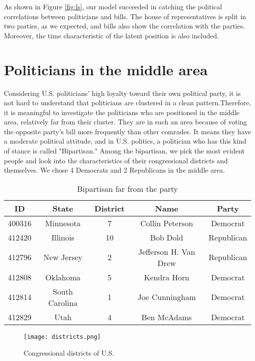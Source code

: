 \documentclass[a4paper, 11pt]{report}
\begin{document}
\begin{itemize}
\quad As shown in Figure \ref{fig:ls}, our model succeeded in catching the political correlations between politicians and bills. The house of representatives is split in two parties, as we expected, and bills also show the correlation with the parties. Moreover, the time characteristic of the latent position is also included.

\section{Politicians in the middle area}

\quad Considering U.S. politicians' high loyalty toward their own political party, it is not hard to understand that politicians are clustered in a clean pattern.Therefore, it is meaningful to investigate the politicians who are positioned in the middle area, relatively far from their cluster. They are in such an area because of voting the opposite party's bill more frequently than other comrades. It means they have a moderate political attitude, and in U.S. politics, a politician who has this kind of stance is called "Bipartisan." Among the bipartisan, we pick the most evident people and look into the characteristics of their congressional districts and themselves. We chose 4 Democrats and 2 Republicans in the middle area. 

\begin{table}[h!]
\centering
    \begin{tabular}{c | c | c | c | c}
        ID & State & District & Name & Party  \\
        \hline \hline
        400316 & Minnesota & 7 & Collin Peterson & Democrat \\
        412420 & Illinois & 10 & Bob Dold & Republican \\
        412796 & New Jersey & 2 & Jefferson H. Van Drew & Republican  \\
        412808 & Oklahoma & 5 & Kendra Horn & Democrat  \\
        412814 & South Carolina & 1 & Joe Cunningham & Democrat  \\
        412829 & Utah & 4 & Ben McAdams & Democrat  \\
    \end{tabular}
    \caption{Bipartisan far from the party}
    \label{tab:data}
\end{table}

\begin{figure}[h]
  \begin{center}
    \texttt{[image: districts.png]}
  \end{center}
  \caption{Congressional districts of U.S. }
  \label{fig:districts}
\end{figure}


\end{itemize}
\end{document}
